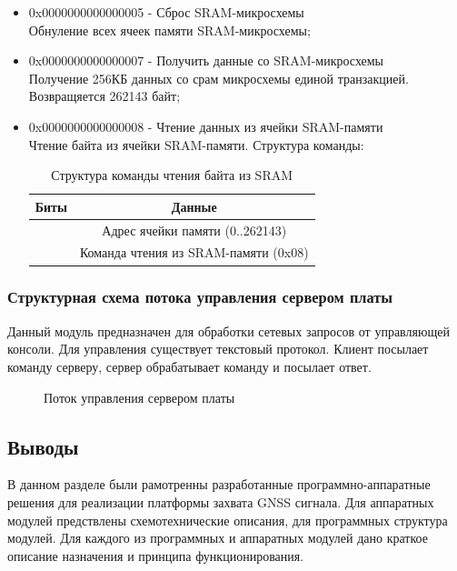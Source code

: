 \begin{itemize}
\item 0x0000000000000005 - Сброс SRAM-микросхемы \\ 
	Обнуление всех ячеек памяти SRAM-микросхемы;

\item 0x0000000000000007 - Получить данные со SRAM-микросхемы \\ 
	Получение 256КБ данных со срам микросхемы единой транзакцией. Возвращяется 262143 байт;

\item 0x0000000000000008 - Чтение данных из ячейки SRAM-памяти \\ 
	Чтение байта из ячейки SRAM-памяти. Структура команды:
	\begin{table}[H]
	\begin{center}
	\caption{Структура команды чтения байта из SRAM}
	\label{tab:read_sram}
	\begin{tabular}{|c|c|}
		\hline
			Биты & Данные \\
		\hline
			[25:08] & Адрес ячейки памяти (0..262143) \\
		\hline
			[07:00] & Команда чтения из SRAM-памяти (0x08) \\
		\hline
	\end{tabular}
	\end{center}
	\end{table}
\end{itemize}


\subsubsection*{Структурная схема потока управления сервером платы}
Данный модуль предназначен для обработки сетевых запросов от управляющей консоли. Для управления существует текстовый протокол.
Клиент посылает команду серверу, сервер обрабатывает команду и посылает ответ.

\begin{figure}[H]
\begin{center}
\end{center}
\caption{Поток управления сервером платы}
\label{pic:gui_server}
\end{figure}


\subsection*{Выводы}
В данном разделе были рамотренны разработанные программно-аппаратные решения для реализации платформы захвата GNSS сигнала.
Для аппаратных модулей предствлены схемотехнические описания, для программных структура модулей. Для каждого из программных
и аппаратных модулей дано краткое описание назначения и принципа функционирования.

\newpage

